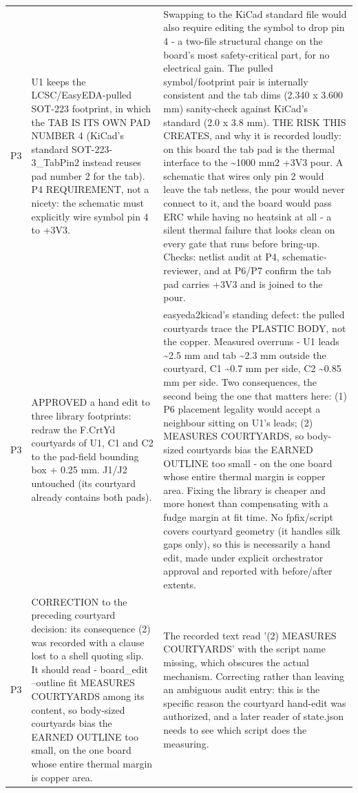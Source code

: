 \documentclass[11pt,a4paper]{article}
\begin{document}
{\begin{longtable}{lp{5.2cm}p{7.2cm}}
P3 & U1 keeps the LCSC/EasyEDA-pulled SOT-223 footprint, in which the TAB IS ITS OWN PAD NUMBER 4 (KiCad's standard SOT-223-3\_TabPin2 instead reuses pad number 2 for the tab). P4 REQUIREMENT, not a nicety: the schematic must explicitly wire symbol pin 4 to +3V3. & Swapping to the KiCad standard file would also require editing the symbol to drop pin 4 - a two-file structural change on the board's most safety-critical part, for no electrical gain. The pulled symbol/footprint pair is internally consistent and the tab dims (2.340 x 3.600 mm) sanity-check against KiCad's standard (2.0 x 3.8 mm). THE RISK THIS CREATES, and why it is recorded loudly: on this board the tab pad is the thermal interface to the \textasciitilde{}1000 mm2 +3V3 pour. A schematic that wires only pin 2 would leave the tab netless, the pour would never connect to it, and the board would pass ERC while having no heatsink at all - a silent thermal failure that looks clean on every gate that runs before bring-up. Checks: netlist audit at P4, schematic-reviewer, and at P6/P7 confirm the tab pad carries +3V3 and is joined to the pour. \\
P3 & APPROVED a hand edit to three library footprints: redraw the F.CrtYd courtyards of U1, C1 and C2 to the pad-field bounding box + 0.25 mm. J1/J2 untouched (its courtyard already contains both pads). & easyeda2kicad's standing defect: the pulled courtyards trace the PLASTIC BODY, not the copper. Measured overruns - U1 leads \textasciitilde{}2.5 mm and tab \textasciitilde{}2.3 mm outside the courtyard, C1 \textasciitilde{}0.7 mm per side, C2 \textasciitilde{}0.85 mm per side. Two consequences, the second being the one that matters here: (1) P6 placement legality would accept a neighbour sitting on U1's leads; (2)  MEASURES COURTYARDS, so body-sized courtyards bias the EARNED OUTLINE too small - on the one board whose entire thermal margin is copper area. Fixing the library is cheaper and more honest than compensating with a fudge margin at fit time. No fpfix/script covers courtyard geometry (it handles silk gaps only), so this is necessarily a hand edit, made under explicit orchestrator approval and reported with before/after extents. \\
P3 & CORRECTION to the preceding courtyard decision: its consequence (2) was recorded with a clause lost to a shell quoting slip. It should read - board\_edit --outline fit MEASURES COURTYARDS among its content, so body-sized courtyards bias the EARNED OUTLINE too small, on the one board whose entire thermal margin is copper area. & The recorded text read '(2)  MEASURES COURTYARDS' with the script name missing, which obscures the actual mechanism. Correcting rather than leaving an ambiguous audit entry: this is the specific reason the courtyard hand-edit was authorized, and a later reader of state.json needs to see which script does the measuring. \\

\end{longtable}}
\end{document}
